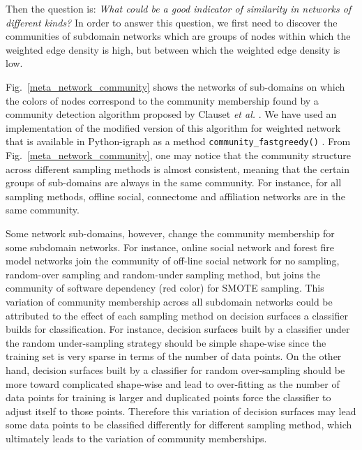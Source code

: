 Then the question is: \textit{What could be a good indicator of similarity in networks of different kinds?} In order to answer this question, we first need to discover the communities of subdomain networks which are groups of nodes within which the weighted edge density is high, but between which the weighted edge density is low.

Fig.~\ref{meta_network_community} shows the networks of sub-domains on which the colors of nodes correspond to the community membership found by a community detection algorithm proposed by Clauset \textit{et al.} \cite{CNMAlgorithm}. We have used an implementation of the modified version of this algorithm for weighted network that is available in Python-igraph as a method \texttt{community\_fastgreedy()} \cite{igraph}. From Fig.~\ref{meta_network_community}, one may notice that the community structure across different sampling methods is almost consistent, meaning that the certain groups of sub-domains are always in the same community.  For instance, for all sampling methods, offline social, connectome and affiliation networks are in the same community. 

Some network sub-domains, however, change the community membership for some subdomain networks. For instance, online social network and forest fire model networks join the community of off-line social network for no sampling, random-over sampling and random-under sampling method, but joins the community of software dependency (red color) for SMOTE sampling. This variation of community membership across all subdomain networks could be attributed to the effect of each sampling method on decision surfaces a classifier builds for classification. For instance, decision surfaces built by a classifier under the random under-sampling strategy should be simple shape-wise since the training set is very sparse in terms of the number of data points. On the other hand, decision surfaces built by a classifier for random over-sampling should be more toward complicated shape-wise and lead to over-fitting as the number of data points for training is larger and duplicated points force the classifier to adjust itself to those points. Therefore this variation of decision surfaces may lead some data points to be classified differently for different sampling method, which ultimately leads to the variation of community memberships.


